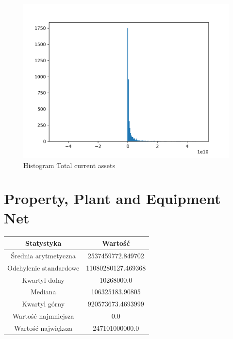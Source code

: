 \documentclass{article}
\begin{document}
\begin{figure}[h!]
    \includegraphics[width=\linewidth]{variables/Total current assets.png}
    \caption{Histogram Total current assets }
\end{figure}\section{ Property, Plant and Equipment Net }

\begin{center}
    \begin{tabular}{|c | c|} 
    \hline
    Statystyka & Wartość \\
    \hline\hline
    Średnia arytmetyczna & 2537459772.849702 \\ 
    \hline
    Odchylenie standardowe & 11080280127.469368 \\
    \hline
    Kwartyl dolny & 10268000.0 \\
    \hline
    Mediana & 106325183.90805 \\
    \hline
    Kwartyl górny & 920573673.4693999 \\
    \hline
    Wartość najmniejsza & 0.0 \\
    \hline
    Wartość największa & 247101000000.0 \\
    \hline
   \end{tabular}
\end{center}
\end{document}
